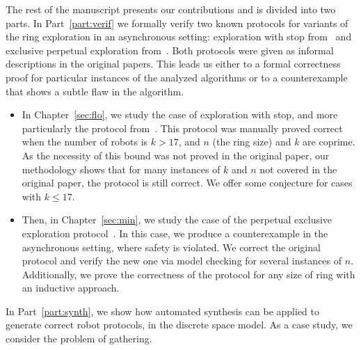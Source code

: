 The rest of the manuscript presents our contributions and is divided into two parts. In Part~\ref{part:verif} we formally verify two known
protocols for variants of the ring exploration in an asynchronous
setting: exploration with stop from~\cite{flocchini_computing_2007}
and exclusive perpetual exploration
from~\cite{blin_exclusive_2010}. Both protocols were given as 
 informal descriptions in the original papers. This leads us either to a formal correctness proof 
 for particular instances of the analyzed algorithms or to
a counterexample that shows a subtle flaw in the algorithm. 
\begin{itemize}
\item  In Chapter~\ref{sec:flo}, we study the case of exploration with stop, and 
more particularly the protocol from~\cite{flocchini_computing_2007}.
  This protocol was manually proved correct
  when the number of robots is $k>17$, and $n$ (the ring size) and $k$
  are coprime. As the necessity of this bound was not proved in the
  original paper, our methodology shows that for many instances
  of $k$ and $n$ not covered in the original paper, the protocol is
  still correct. We offer some conjecture for cases with $k\leq 17$. 
\item Then, in Chapter~\ref{sec:min}, we study the case of the perpetual
  exclusive exploration protocol~\cite{blin_exclusive_2010}. In this
  case, we produce a counterexample in the
   asynchronous setting, where safety is violated. We
  correct the original protocol and verify the new one via
  model checking for several instances of $n$. Additionally, we prove
  the correctness of the protocol for any size of ring with an inductive
  approach.  
\end{itemize}
In Part~\ref{part:synth}, we show how automated synthesis can be applied to generate correct robot protocols, 
in the discrete space model. As a case study, we consider the problem of gathering.
